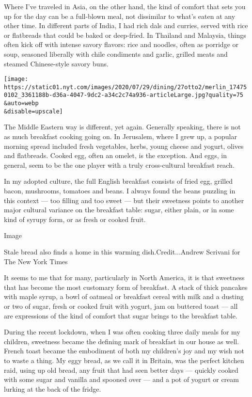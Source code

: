 Where I've traveled in Asia, on the other hand, the kind of comfort that
sets you up for the day can be a full-blown meal, not dissimilar to
what's eaten at any other time. In different parts of India, I had rich
dals and curries, served with rice or flatbreads that could be baked or
deep-fried. In Thailand and Malaysia, things often kick off with intense
savory flavors: rice and noodles, often as porridge or soup, seasoned
liberally with chile condiments and garlic, grilled meats and steamed
Chinese-style savory buns.

\texttt{[image: https://static01.nyt.com/images/2020/07/29/dining/27otto2/merlin\_174750102\_3361188b-d36a-4047-9dc2-a34c2c74a936-articleLarge.jpg?quality=75\\\&auto=webp\\\&disable=upscale]}

The Middle Eastern way is different, yet again. Generally speaking,
there is not as much breakfast cooking going on. In Jerusalem, where I
grew up, a popular morning spread included fresh vegetables, herbs,
young cheese and yogurt, olives and flatbreads. Cooked egg, often an
omelet, is the exception. And eggs, in general, seem to be the one
player with a truly cross-cultural breakfast reach.

In my adopted culture, the full English breakfast consists of fried egg,
grilled bacon, mushrooms, tomatoes and beans. I always found the beans
puzzling in this context --- too filling and too sweet --- but their
sweetness points to another major cultural variance on the breakfast
table: sugar, either plain, or in some kind of syrupy form, or as fresh
or cooked fruit.

Image

Stale bread also finds a home in this warming dish.Credit...Andrew
Scrivani for The New York Times

It seems to me that for many, particularly in North America, it is that
sweetness that has become the most customary form of breakfast. A stack
of thick pancakes with maple syrup, a bowl of oatmeal or breakfast
cereal with milk and a dusting or two of sugar, fresh or cooked fruit
with yogurt, jam on buttered toast --- all are expressions of the kind
of comfort that sugar brings to the breakfast table.

During the recent lockdown, when I was often cooking three daily meals
for my children, sweetness became the defining mark of breakfast in our
house as well. French toast became the embodiment of both my children's
joy and my wish not to waste a thing. My eggy bread, as we call it in
Britain, was the perfect kitchen raid, using up old bread, any fruit
that had seen better days --- quickly cooked with some sugar and vanilla
and spooned over --- and a pot of yogurt or cream lurking at the back of
the fridge.

